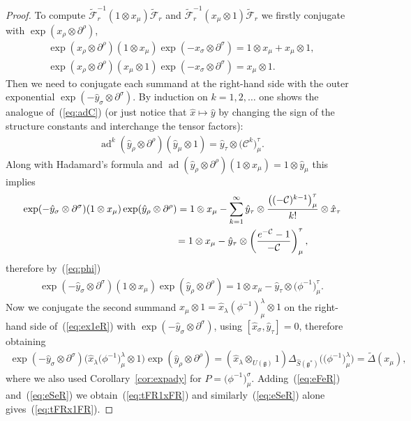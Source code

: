 \documentclass[pdftex]{sigma}
\def\gg{\mathfrak{g}}
\def\CC{\mathcal{C}}
\def\hx{\hat{x}}
\def\hy{\hat{y}}
\def\ad{\operatorname{ad}}
\numberwithin{equation}{section}
\begin{document}
\begin{proof}
To compute $\tilde{\mathcal{F}}^{-1}_r(1\otimes x_\mu)\tilde{\mathcal{F}}_r$ and $\tilde{\mathcal{F}}^{-1}_r(x_\mu\otimes 1)\tilde{\mathcal{F}}_r$ we firstly conjugate with $\exp(x_\rho\otimes\partial^\rho)$,
\begin{gather}
\exp(x_\rho\otimes\partial^\rho)(1\otimes x_\mu) \exp(-x_\sigma\otimes\partial^\sigma) = 1\otimes x_\mu + x_\mu \otimes 1,\nonumber\\
\exp(x_\rho\otimes\partial^\rho)(x_\mu\otimes 1)\exp(-x_\sigma\otimes\partial^\sigma) = x_\mu \otimes 1.\label{eq:ex1eR}
\end{gather}
Then we need to conjugate each summand at the right-hand side with the outer exponential $\exp(-\hy_\sigma\otimes\partial^\sigma)$. By induction on $k = 1,2,\ldots$ one shows the analogue of~(\ref{eq:adC}) (or just notice that $\hx\mapsto \hy$ by changing the sign of the structure constants and interchange the tensor factors):
\begin{gather*}%
\ad^k(\hy_\rho\otimes\partial^\rho) (\hy_\mu\otimes 1) = \hy_\tau\otimes\big(\CC^k\big)^\tau_\mu.
\end{gather*}
Along with Hadamard's formula and
$\ad(\hy_\rho\otimes\partial^\rho)(1\otimes x_\mu)=1\otimes\hy_\mu$
this implies
\begin{gather*}
\begin{split}
&\exp(-\hy_\sigma\otimes\partial^\sigma)(1\otimes x_\mu)\exp(\hy_\rho\otimes\partial^\rho) = 1\otimes x_\mu - \sum_{k=1}^\infty \hy_\tau\otimes\frac{\big((-\CC)^{k-1}\big)^\tau_\mu}{k!}\otimes\hx_\tau \\
& \hphantom{\exp(-\hy_\sigma\otimes\partial^\sigma)(1\otimes x_\mu)\exp(\hy_\rho\otimes\partial^\rho)}{}
= 1\otimes x_\mu -\hy_\tau\otimes\left(\frac{e^{-\CC}-1}{-\CC}\right)^\tau_\mu,
\end{split}
\end{gather*}
therefore by~(\ref{eq:phi})
\begin{gather}\label{eq:eFeR}
\exp(-\hy_\sigma\otimes\partial^\sigma)(1\otimes x_\mu)\exp(\hy_\rho\otimes\partial^\rho) = 1\otimes x_\mu - \hat{y}_\tau\otimes\big(\phi^{-1}\big)^\tau_\mu.
\end{gather}
Now we conjugate
the second summand $x_\mu\otimes 1 = \hx_\lambda(\phi^{-1})^\lambda_\mu\otimes 1$ on the right-hand side of~(\ref{eq:ex1eR}) with $\exp(-\hy_\sigma\otimes\partial^\sigma)$, using $[\hx_\sigma,\hy_\tau] = 0$, therefore obtaining
\begin{gather}\label{eq:eSeR}
\exp(-\hy_\sigma\otimes\partial^\sigma)\big(\hx_\lambda\big(\phi^{-1}\big)^\lambda_\mu\otimes 1\big)\exp(\hy_\rho\otimes\partial^\rho) = (\hx_\lambda\otimes_{U(\gg)}1)\Delta_{\hat{S}(\gg^*)}\big(\big(\phi^{-1}\big)^\lambda_\mu\big) = \tilde\Delta(x_\mu),\!\!\!
\end{gather}
where we also used Corollary~\ref{cor:expady} for $P = \big(\phi^{-1}\big)^\sigma_\mu$. Adding~(\ref{eq:eFeR}) and~(\ref{eq:eSeR}) we obtain~(\ref{eq:tFR1xFR}) and similarly~(\ref{eq:eSeR}) alone gives~(\ref{eq:tFRx1FR}).


\end{proof}
\end{document}
